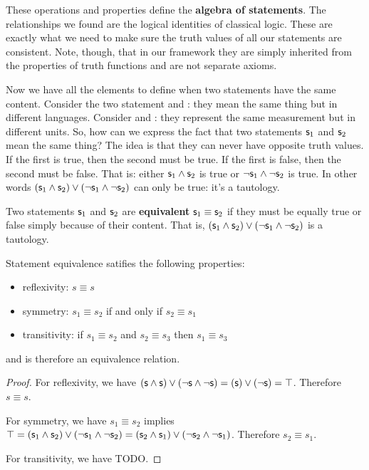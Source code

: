 \documentclass[11pt,letterpaper,fleqn]{memoir} %
\begin{document}
These operations and properties define the \textbf{algebra of statements}. The relationships we found are the logical identities of classical logic. These are exactly what we need to make sure the truth values of all our statements are consistent. Note, though, that in our framework they are simply inherited from the properties of truth functions and are not separate axioms.

Now we have all the elements to define when two statements have the same content. Consider the two statement  and : they mean the same thing but in different languages. Consider  and : they represent the same measurement but in different units. So, how can we express the fact that two statements $\mathsf{s}_1$ and $\mathsf{s}_2$ mean the same thing? The idea is that they can never have opposite truth values. If the first is true, then the second must be true. If the first is false, then the second must be false. That is: either $\mathsf{s}_1 \wedge \mathsf{s}_2$ is true or $\neg\mathsf{s}_1 \wedge \neg\mathsf{s}_2$ is true. In other words $(\mathsf{s}_1 \wedge \mathsf{s}_2) \vee (\neg\mathsf{s}_1 \wedge \neg\mathsf{s}_2)$ can only be true: it's a tautology.

\begin{mathSection}

\begin{defn}
	Two statements $\mathsf{s}_1$ and $\mathsf{s}_2$ are \textbf{equivalent} $\mathsf{s}_1 \equiv \mathsf{s}_2$ if they must be equally true or false simply because of their content. That is, $(\mathsf{s}_1 \wedge \mathsf{s}_2) \vee (\neg\mathsf{s}_1 \wedge \neg\mathsf{s}_2)$ is a tautology.
\end{defn}

\begin{prop}
	Statement equivalence satifies the following properties:
	\begin{itemize}
		\item reflexivity: $s \equiv s$
		\item symmetry: $s_1 \equiv s_2$ if and only if $s_2 \equiv s_1$
		\item transitivity: if $s_1 \equiv s_2$ and $s_2 \equiv s_3$ then $s_1 \equiv s_3$
	\end{itemize}
	and is therefore an equivalence relation.
\end{prop}
\begin{proof}
	For reflexivity, we have $(\mathsf{s} \wedge \mathsf{s}) \vee (\neg\mathsf{s} \wedge \neg\mathsf{s}) = (\mathsf{s}) \vee (\neg\mathsf{s}) = \top$. Therefore $s \equiv s$.
	
	For symmetry, we have $s_1 \equiv s_2$ implies $\top = (\mathsf{s}_1 \wedge \mathsf{s}_2) \vee (\neg\mathsf{s}_1 \wedge \neg\mathsf{s}_2) = (\mathsf{s}_2 \wedge \mathsf{s}_1) \vee (\neg\mathsf{s}_2 \wedge \neg\mathsf{s}_1)$. Therefore $s_2 \equiv s_1$.
	
	For transitivity, we have TODO.
\end{proof}

\end{mathSection}
\end{document}
